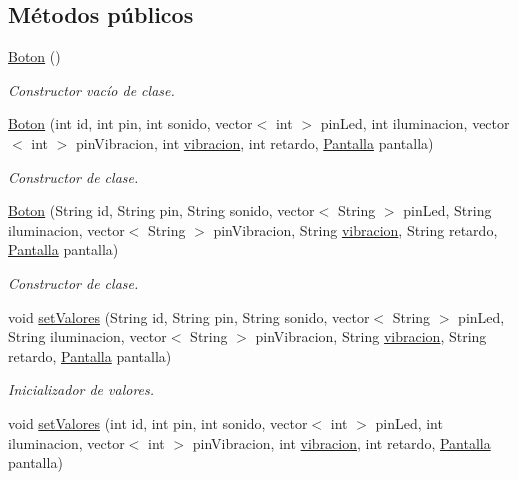 \subsection*{Métodos públicos}
\begin{DoxyCompactItemize}
\item 
\hyperlink{classBoton_ad4aa53d4e2613ee16a3474d96264785c}{Boton} ()
\begin{DoxyCompactList}\small\item\em Constructor vacío de clase. \end{DoxyCompactList}\item 
\hyperlink{classBoton_afd02f1f5f10676a4c20686b7526071b9}{Boton} (int id, int pin, int sonido, vector$<$ int $>$ pin\+Led, int iluminacion, vector$<$ int $>$ pin\+Vibracion, int \hyperlink{Vibracion_8h_adc29bdc2016021e3f44d420abd54a301}{vibracion}, int retardo, \hyperlink{classPantalla}{Pantalla} pantalla)
\begin{DoxyCompactList}\small\item\em Constructor de clase. \end{DoxyCompactList}\item 
\hyperlink{classBoton_ad645a314a67b707de4d567e6f8ead71c}{Boton} (String id, String pin, String sonido, vector$<$ String $>$ pin\+Led, String iluminacion, vector$<$ String $>$ pin\+Vibracion, String \hyperlink{Vibracion_8h_adc29bdc2016021e3f44d420abd54a301}{vibracion}, String retardo, \hyperlink{classPantalla}{Pantalla} pantalla)
\begin{DoxyCompactList}\small\item\em Constructor de clase. \end{DoxyCompactList}\item 
void \hyperlink{classBoton_aa5b46caccce94c91bf26487b0e57e242}{set\+Valores} (String id, String pin, String sonido, vector$<$ String $>$ pin\+Led, String iluminacion, vector$<$ String $>$ pin\+Vibracion, String \hyperlink{Vibracion_8h_adc29bdc2016021e3f44d420abd54a301}{vibracion}, String retardo, \hyperlink{classPantalla}{Pantalla} pantalla)
\begin{DoxyCompactList}\small\item\em Inicializador de valores. \end{DoxyCompactList}\item 
void \hyperlink{classBoton_aa1af20c03db07d9ae7b332445d4cd027}{set\+Valores} (int id, int pin, int sonido, vector$<$ int $>$ pin\+Led, int iluminacion, vector$<$ int $>$ pin\+Vibracion, int \hyperlink{Vibracion_8h_adc29bdc2016021e3f44d420abd54a301}{vibracion}, int retardo, \hyperlink{classPantalla}{Pantalla} pantalla)

\end{DoxyCompactItemize}
